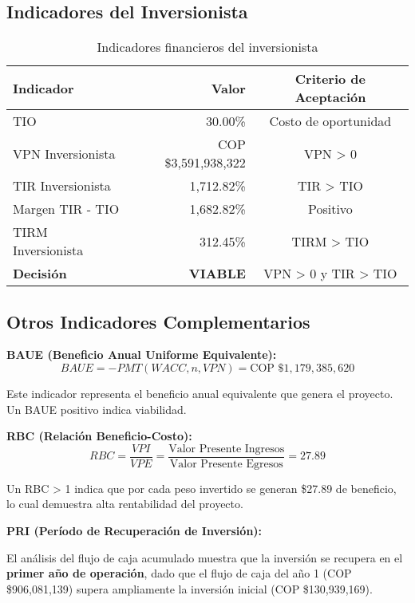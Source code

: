 \subsection{Indicadores del Inversionista}

\begin{table}[H]
\centering
\begin{tabular}{lrc}
\toprule
\textbf{Indicador} & \textbf{Valor} & \textbf{Criterio de Aceptación} \\
\midrule
TIO & 30.00\% & Costo de oportunidad \\
VPN Inversionista & COP \$3,591,938,322 & VPN > 0 \\
TIR Inversionista & 1,712.82\% & TIR > TIO \\
Margen TIR - TIO & 1,682.82\% & Positivo \\
TIRM Inversionista & 312.45\% & TIRM > TIO \\
\midrule
\textbf{Decisión} & \textbf{VIABLE} & VPN > 0 y TIR > TIO \\
\bottomrule
\end{tabular}
\caption{Indicadores financieros del inversionista}
\end{table}

\subsection{Otros Indicadores Complementarios}

\textbf{BAUE (Beneficio Anual Uniforme Equivalente):}
\begin{equation}
BAUE = -PMT(WACC, n, VPN) = \text{COP } \$1,179,385,620
\end{equation}

Este indicador representa el beneficio anual equivalente que genera el proyecto. Un BAUE positivo indica viabilidad.

\textbf{RBC (Relación Beneficio-Costo):}
\begin{equation}
RBC = \frac{VPI}{VPE} = \frac{\text{Valor Presente Ingresos}}{\text{Valor Presente Egresos}} = 27.89
\end{equation}

Un RBC > 1 indica que por cada peso invertido se generan \$27.89 de beneficio, lo cual demuestra alta rentabilidad del proyecto.

\textbf{PRI (Período de Recuperación de Inversión):}

El análisis del flujo de caja acumulado muestra que la inversión se recupera en el \textbf{primer año de operación}, dado que el flujo de caja del año 1 (COP \$906,081,139) supera ampliamente la inversión inicial (COP \$130,939,169).


